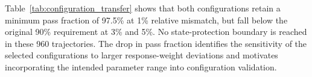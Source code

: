 Table~\ref{tab:configuration_transfer} shows that both configurations retain a minimum pass fraction of 97.5\% at 1\% relative mismatch, but fall below the original 90\% requirement at 3\% and 5\%. No state-protection boundary is reached in these 960 trajectories. The drop in pass fraction identifies the sensitivity of the selected configurations to larger response-weight deviations and motivates incorporating the intended parameter range into configuration validation.
